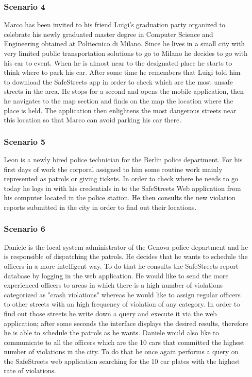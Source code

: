 \subsubsection{Scenario 4}
Marco has been invited to his friend Luigi's graduation party organized to celebrate his newly graduated master degree in Computer Science and Engineering obtained at Politecnico di Milano. Since he lives in a small city with very limited public transportation solutions to go to Milano he decides to go with his car to event. When he is almost near to the designated place he starts to think where to park his car. After some time he remembers that Luigi told him to download the SafeStreets app in order to check which are the most unsafe streets in the area. He stops for a second and opens the mobile application, then he navigates to the map section and finds on the map the location where the place is held.  The application then enlightens the most dangerous streets near this location so that Marco can avoid parking his car there.

\subsubsection{Scenario 5}
Leon is a newly hired police technician for the Berlin police department. For his first days of work the corporal assigned to him some routine work mainly represented as patrols or giving tickets. In order to check where he needs to go today he logs in with his credentials in to the SafeStreets Web application from his computer located in the police station. He then consults the new violation reports submitted in the city in order to find out their locations. 

\subsubsection{Scenario 6}
Daniele is the local system administrator of the Genova police department and he is responsible of dispatching the patrols. He decides that he wants to schedule the officers in a more intelligent way. To do that he consults the SafeStreets report database by logging in the web application. He would like to send the more experienced officers to areas in which there is a high number of violations categorized as "crash violations" whereas he would like to assign regular officers to other streets with an high frequency of violation of any category. In order to find out those streets he write down a query and execute it via the web application; after some seconds the interface displays the desired results, therefore he is able to schedule the patrols as he wants. Daniele would also like to communicate to all the officers which are the 10 cars that committed the highest number of violations in the city. To do that he once again performs a query on the SafeStreets web application searching for the 10 car plates with the highest rate of violations.

